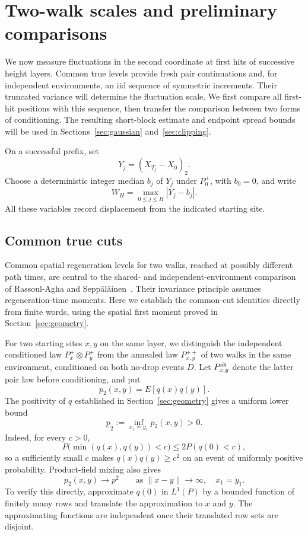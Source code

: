 \section{Two-walk scales and preliminary comparisons}\label{sec:fluctuations}

We now measure fluctuations in the second coordinate at first hits of
successive height layers. Common true levels provide fresh pair
continuations and, for independent environments, an iid sequence of
symmetric increments. Their truncated variance will determine the
fluctuation scale. We first compare all first-hit positions with this
sequence, then transfer the comparison between two forms of conditioning.
The resulting short-block estimate and endpoint spread bounds will be
used in Sections~\ref{sec:gaussian} and~\ref{sec:clipping}.

On a successful prefix, set
\[
Y_j=(X_{T_j}-X_0)_2.
\]
Choose a deterministic integer median \(b_j\) of \(Y_j\) under \(P_0^+\),
with \(b_0=0\), and write
\[
W_H=\max_{0\le j\le H}|Y_j-b_j|.
\]
All these variables record displacement from the indicated starting site.

\subsection{Common true cuts}

Common spatial regeneration levels for two walks, reached at possibly
different path times, are central to the shared- and independent-environment
comparison of Rassoul-Agha and Sepp\"al\"ainen~\cite[Section~7]{RassoulAghaSeppalainen2009}.
Their invariance principle assumes regeneration-time moments. Here we
establish the common-cut identities directly from finite words, using the
spatial first moment proved in Section~\ref{sec:geometry}.

For two starting sites \(x,y\) on the same layer, we distinguish the
independent conditioned law \(P_x^+\otimes P_y^+\) from the annealed law
\(P_{x,y}^{++}\) of two walks in the same environment, conditioned on both
no-drop events \(D\). Let \(P_{x,y}^{\rm sh}\) denote the latter pair law
before conditioning, and put
\[
p_2(x,y)=E[q(x)q(y)].
\]
The positivity of \(q\) established in Section~\ref{sec:geometry} gives a
uniform lower bound
\[
\underline p_2:=\inf_{x_1=y_1}p_2(x,y)>0.
\]
Indeed, for every \(c>0\),
\[
P\bigl(\min(q(x),q(y))<c\bigr)\le 2P(q(0)<c),
\]
so a sufficiently small \(c\) makes \(q(x)q(y)\ge c^2\) on an event of
uniformly positive probability. Product-field mixing also gives
\[
p_2(x,y)\longrightarrow p^2
\qquad\text{as }\|x-y\|\longrightarrow\infty,\quad x_1=y_1.
\]
To verify this directly, approximate \(q(0)\) in \(L^1(P)\) by a bounded
function of finitely many rows and translate the approximation to \(x\)
and \(y\). The approximating functions are independent once their
translated row sets are disjoint.


